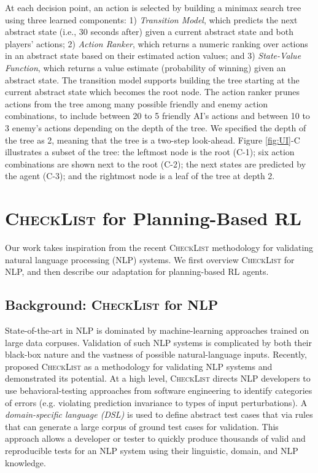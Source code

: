 \documentclass[letterpaper]{article} %
\begin{document}
At each decision point, an action is selected by building a minimax search tree using three learned components: 1) \emph{Transition Model}, which predicts the next abstract state (i.e., 30 seconds after) given a current abstract state and both players' actions; 
2) \emph{Action Ranker}, which returns a numeric ranking over actions in an abstract state based on their estimated action values; and 3) \emph{State-Value Function}, which returns a value estimate (probability of winning) given an abstract state. 
The transition model supports building the tree starting at the current abstract state which becomes the root node. 
The action ranker prunes actions from the tree among many possible friendly and enemy action combinations, to include between 20 to 5 friendly AI's actions and between 10 to 3 enemy's actions depending on the depth of the tree.
We specified the depth of the tree as 2, meaning that the tree is a two-step look-ahead.
Figure \ref{fig:UI}-C illustrates a subset of the tree: the leftmost node is the root (C-1); six action combinations are shown next to the root (C-2); the next states are predicted by the agent (C-3); and the rightmost node is a leaf of the tree at depth 2.



\section{\textsc{CheckList} for Planning-Based RL}
\label{sec:checklist}

Our work takes inspiration from the recent \textsc{CheckList} methodology for validating natural language processing (NLP) systems.
We first overview \textsc{CheckList} for NLP, and then describe our adaptation for planning-based RL agents.

\subsection{Background: \textsc{CheckList} for NLP}

State-of-the-art in NLP is dominated by machine-learning approaches trained on large data corpuses. Validation of such NLP systems is complicated by both their black-box nature and the vastness of possible natural-language inputs. Recently, \citet{ribeiro2020accuracy} proposed \textsc{CheckList} as a methodology for validating NLP systems and demonstrated its potential. At a high level, \textsc{CheckList} directs NLP developers to use behavioral-testing approaches from software engineering to identify categories of errors (e.g. violating prediction invariance to types of input perturbations). A \emph{domain-specific language (DSL)} is used to define abstract test cases that via rules that can generate a large corpus of ground test cases for validation. This approach allows a developer or tester to quickly produce thousands of valid and reproducible tests for an NLP system using their linguistic, domain, and NLP knowledge.
\end{document}
